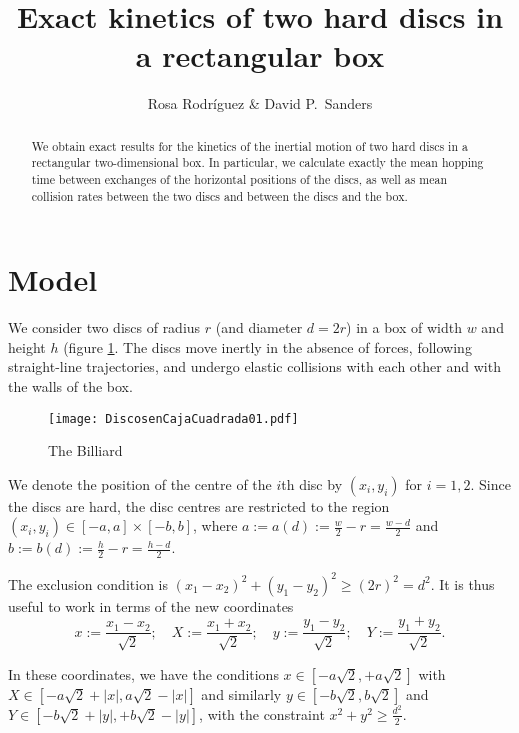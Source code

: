 \documentclass[a4paper,10pt]{article}
\title{Exact kinetics of two hard discs in a rectangular box}
\author{Rosa Rodríguez \& David P.~Sanders}
\newcommand{\defeq}{:=}
\begin{document}
\maketitle
\begin{abstract}
  We obtain exact results for the kinetics of the inertial motion of two hard discs in a rectangular two-dimensional box.
  In particular, we calculate exactly the mean hopping time between exchanges of the horizontal positions of the discs, as well as mean collision rates between the two discs and between the discs and the box. 
\end{abstract}

\section{Model}

We consider two discs of radius $r$ (and diameter $d=2r$) in a box of width $w$ and height $h$ (figure
\ref{billar01}. The discs move inertly in the absence of forces, following straight-line trajectories, and undergo elastic collisions with each other and with the walls of the box.

\begin{figure}
  \centering
  \texttt{[image: DiscosenCajaCuadrada01.pdf]}
  \caption{The Billiard}\label{billar01}
\end{figure}


We denote the position of the centre of the $i$th disc by $(x_{i}, y_{i})$ for $i=1,2$. Since the discs are hard, the disc centres are restricted to the region $(x_i, y_i) \in [-a,a] \times [-b, b]$, where $a \defeq a(d) \defeq \frac{w}{2} - r = \frac{w-d}{2}$ and $b \defeq b(d) \defeq \frac{h}{2} - r = \frac{h-d}{2}$.

The exclusion condition is $(x_1-x_2)^2 + (y_1-y_2)^2 \ge (2r)^2 = d^2$.
It is thus useful to work in terms of the new coordinates
\begin{equation}\label{cambiocoor01}
 x \defeq \frac{x_1 - x_2}{\sqrt{2}}; 
\quad X \defeq \frac{x_1 + x_2}{\sqrt{2}}; 
\quad y \defeq \frac{y_1 - y_2}{\sqrt{2}}; 
\quad Y \defeq \frac{y_1 + y_2}{\sqrt{2}}.
\end{equation}


In these coordinates, we have the conditions $x \in [-a \sqrt{2}, +a \sqrt{2}]$ with $X \in [-a \sqrt{2} + |x|, a \sqrt{2} - |x|]$ and similarly $y \in [-b \sqrt{2}, b \sqrt{2}]$ and $Y \in [-b \sqrt{2} + |y|, +b \sqrt{2} - |y|]$,  with the constraint $x^2 + y^2 \ge \frac{d^2}{2}$.
\end{document}
